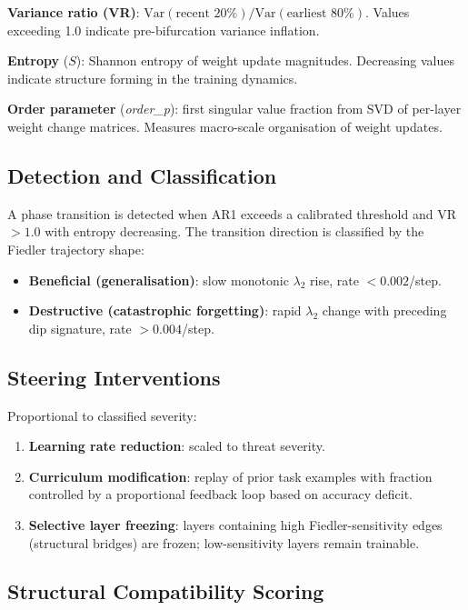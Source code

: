 \documentclass[10pt,twocolumn]{article}
\begin{document}
\textbf{Variance ratio (VR)}: $\mathrm{Var}(\text{recent } 20\%) / \mathrm{Var}(\text{earliest } 80\%)$. Values exceeding 1.0 indicate pre-bifurcation variance inflation.

\textbf{Entropy} ($S$): Shannon entropy of weight update magnitudes. Decreasing values indicate structure forming in the training dynamics.

\textbf{Order parameter} (\textit{order\_p}): first singular value fraction from SVD of per-layer weight change matrices. Measures macro-scale organisation of weight updates.

\subsection{Detection and Classification}

A phase transition is detected when AR1 exceeds a calibrated threshold and VR $> 1.0$ with entropy decreasing. The transition direction is classified by the Fiedler trajectory shape:

\begin{itemize}
  \item \textbf{Beneficial (generalisation)}: slow monotonic $\lambda_2$ rise, rate $< 0.002$/step.
  \item \textbf{Destructive (catastrophic forgetting)}: rapid $\lambda_2$ change with preceding dip signature, rate $> 0.004$/step.
\end{itemize}

\subsection{Steering Interventions}

Proportional to classified severity:
\begin{enumerate}
  \item \textbf{Learning rate reduction}: scaled to threat severity.
  \item \textbf{Curriculum modification}: replay of prior task examples with fraction controlled by a proportional feedback loop based on accuracy deficit.
  \item \textbf{Selective layer freezing}: layers containing high Fiedler-sensitivity edges (structural bridges) are frozen; low-sensitivity layers remain trainable.
\end{enumerate}

\subsection{Structural Compatibility Scoring}
\end{document}
